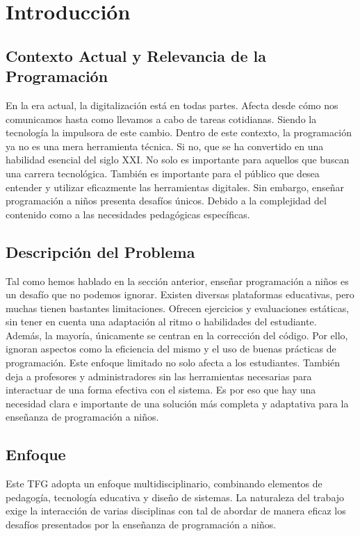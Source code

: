 \chapter{Introducción} \label{chap:introduction}

\section{Contexto Actual y Relevancia de la Programación}
En la era actual, la digitalización está en todas partes. Afecta desde cómo nos comunicamos hasta como llevamos a cabo de tareas cotidianas. Siendo la tecnología la impulsora de este cambio. Dentro de este contexto,  la programación ya no es una mera herramienta técnica. Si no, que se ha convertido en una habilidad esencial del siglo XXI. No solo es importante para aquellos que buscan una carrera tecnológica. También es importante para el público que desea entender y utilizar eficazmente las herramientas digitales. Sin embargo, enseñar programación a niños presenta desafíos únicos. Debido a la complejidad del contenido como a las necesidades pedagógicas específicas.

\section{Descripción del Problema}

Tal como hemos hablado en la sección anterior, enseñar programación a niños es un desafío que no podemos ignorar. Existen diversas plataformas educativas, pero muchas tienen bastantes limitaciones. Ofrecen ejercicios y evaluaciones estáticas, sin tener en cuenta una adaptación al ritmo o habilidades del estudiante. Además, la mayoría, únicamente se centran en la corrección del código. Por ello, ignoran aspectos como la eficiencia del mismo y el uso de buenas prácticas de programación. Este enfoque limitado no solo afecta a los estudiantes. También deja a profesores y administradores sin las herramientas necesarias para interactuar de una forma efectiva con el sistema. Es por eso que hay una necesidad clara e importante de una solución más completa y adaptativa para la enseñanza de programación a niños.

\section{Enfoque}
Este TFG adopta un enfoque multidisciplinario, combinando elementos de pedagogía, tecnología educativa y diseño de sistemas. La naturaleza del trabajo exige la interacción de varias disciplinas con tal de abordar de manera eficaz los desafíos presentados por la enseñanza de programación a niños.

